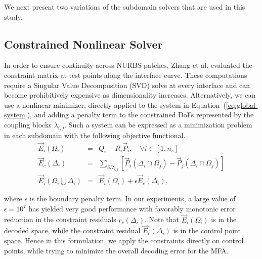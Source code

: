 \documentclass[conference]{IEEEtran}
\newcommand{\eqt}[1]{Equation~(\ref{#1})}
\begin{document}
We next present two variations of the subdomain solvers that are used in this study. 

\subsection{Constrained Nonlinear Solver}

In order to ensure continuity across NURBS patches, Zhang et al.  \cite{zhang-nurbs-continuity} evaluated the constraint matrix at test points along the interface curve. These computations require a Singular Value Decomposition (SVD) solve at every interface and can become prohibitively expensive as dimensionality increases. Alternatively, we can use a nonlinear minimizer, directly applied to the system in \eqt{eq:global-system}, and adding a penalty term to the constrained DoFs represented by the coupling blocks $\lambda_{i,j}$. Such a system can be expressed as a minimization problem in each subdomain with the following objective functional.
%
\begin{eqnarray}
\vec{E}_i(\Omega_i) &=& Q_i - R_i \vec{P}_i, \quad \forall i \in [1, n_s] \nonumber \\
\vec{E}_c(\Delta_{i})    &=& \sum_{\partial \Omega_{i,j}} \left[ \vec{P}_{i}(\Delta_i \cap \Omega_{j}) - \vec{P}_j(\Delta_i \cap \Omega_{j})  \right] \nonumber \\ 
\vec{E}_i(\Omega_i \bigcup \Delta_{i}) &=&  \vec{E}_i(\Omega_i) + \epsilon \vec{E}_c(\Delta_{i}), 
\label{eq:nonlinear-residuals}
\end{eqnarray}

where $\epsilon$ is the boundary penalty term. In our experiments, a large value of $\epsilon=10^{7}$ has yielded very good performance with favorably monotonic error reduction in the constraint residuals $r_c(\Delta_{i})$. Note that $\vec{E}_i(\Omega_i)$ is in the decoded space, while the constraint residual $\vec{E}_c(\Delta_{i})$ is in the control point space. Hence in this formulation, we apply the constraints directly on control points, while trying to minimize the overall decoding error for the MFA.
\end{document}
